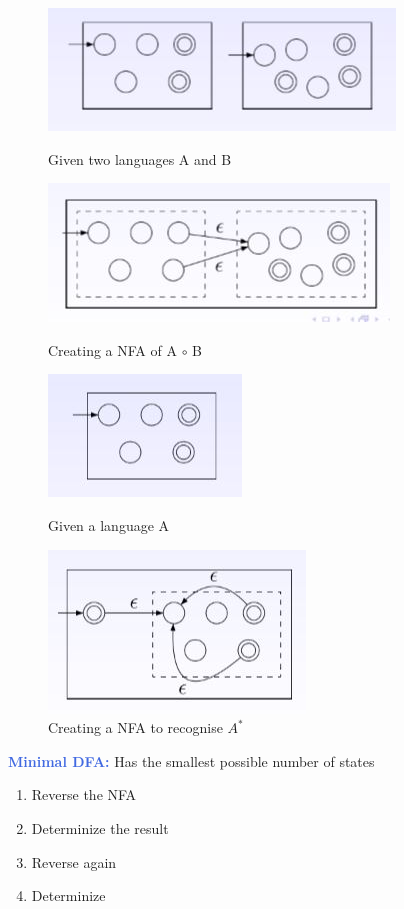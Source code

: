 \documentclass[a4paper,10pt]{article}
\begin{document}
\begin{figure}[h!]
\centerline{ \includegraphics[scale = 0.7]{langcomposition0}}
\caption{Given two languages A and B}
\label{fig}
\vspace{1cm}
\centerline{ \includegraphics[scale = 0.7]{langcomposition}}
\caption{Creating a NFA of A $\circ$ B}
\label{fig}
\vspace{1cm}
\centerline{ \includegraphics[scale = 0.7]{langkleen0}}
\caption{Given a language A}
\label{fig}
\vspace{1cm}
\centerline{ \includegraphics[scale = 0.7]{langkleen}}
\caption{Creating a NFA to recognise $A^{*}$}
\label{fig} 
\end{figure}
\newpage
\noindent \textcolor{RoyalBlue}{\textbf{Minimal DFA:}} Has the smallest possible number of states  \\
\begin{enumerate}
\item Reverse the NFA 
\item Determinize the result 
\item Reverse again 
\item Determinize  \\
\end{enumerate}
\end{document}
